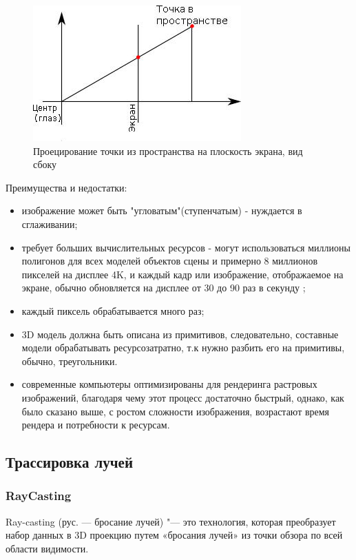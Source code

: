 \begin{figure}
  \centering
  \includegraphics[scale=0.8]{inc/img/raster_projection}
  \caption{Проецирование точки из пространства на плоскость экрана, вид сбоку}
  \label{fig:raster_projection}
\end{figure}

Преимущества и недостатки:
\begin{itemize}
  \item изображение может быть "угловатым"(ступенчатым) - нуждается в сглаживании;
  \item требует больших вычислительных ресурсов - могут использоваться миллионы полигонов для всех моделей объектов сцены и примерно 8 миллионов пикселей на дисплее 4K,
  и каждый кадр или изображение, отображаемое на экране, обычно обновляется на дисплее от 30 до 90 раз в секунду \cite{nvidia:rastr};
  \item каждый пиксель обрабатывается много раз;
  \item 3D модель должна быть описана из примитивов, следовательно, составные модели обрабатывать ресурсозатратно, т.к нужно разбить его на примитивы, обычно, треугольники.
  \item современные компьютеры оптимизированы для рендеринга растровых изображений, благодаря чему этот процесс достаточно быстрый, однако, 
  как было сказано выше, с ростом сложности изображения, возрастают время рендера и потребности к ресурсам.
\end{itemize}
\clearpage

\subsection{Трассировка лучей}
\subsubsection{RayCasting}
Ray-casting (рус. — бросание лучей) "--- это технология, которая преобразует набор данных в 3D проекцию путем «бросания лучей» из точки обзора по всей области видимости. 

